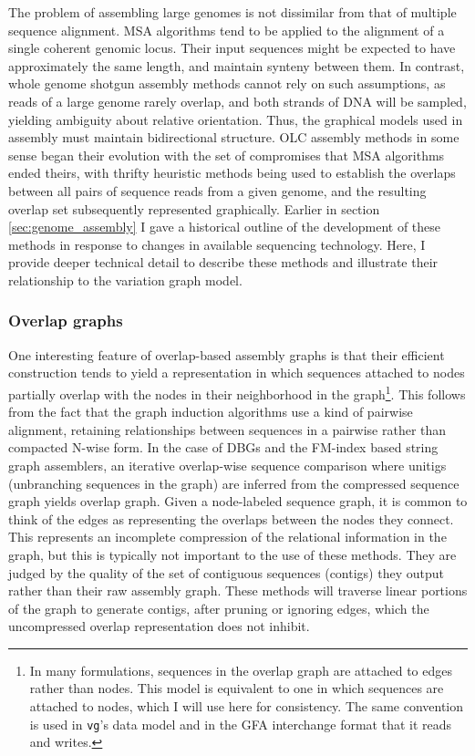The problem of assembling large genomes is not dissimilar from that of multiple sequence alignment.
MSA algorithms tend to be applied to the alignment of a single coherent genomic locus.
Their input sequences might be expected to have approximately the same length, and maintain synteny between them.
In contrast, whole genome shotgun assembly methods cannot rely on such assumptions, as reads of a large genome rarely overlap, and both strands of DNA will be sampled, yielding ambiguity about relative orientation.
Thus, the graphical models used in assembly must maintain bidirectional structure.
OLC assembly methods in some sense began their evolution with the set of compromises that MSA algorithms ended theirs, with thrifty heuristic methods being used to establish the overlaps between all pairs of sequence reads from a given genome, and the resulting overlap set subsequently represented graphically.
Earlier in section \ref{sec:genome_assembly} I gave a historical outline of the development of these methods in response to changes in available sequencing technology.
Here, I provide deeper technical detail to describe these methods and illustrate their relationship to the variation graph model.

\subsubsection{Overlap graphs}
\label{sec:overlap_graphs}

One interesting feature of overlap-based assembly graphs is that their efficient construction tends to yield a representation in which sequences attached to nodes partially overlap with the nodes in their neighborhood in the graph\footnote{In many formulations, sequences in the overlap graph are attached to edges rather than nodes. This model is equivalent to one in which sequences are attached to nodes, which I will use here for consistency. The same convention is used in {\tt vg}'s data model and in the GFA interchange format that it reads and writes.}.
This follows from the fact that the graph induction algorithms use a kind of pairwise alignment, retaining relationships between sequences in a pairwise rather than compacted N-wise form.
In the case of DBGs and the FM-index based string graph assemblers, an iterative overlap-wise sequence comparison where unitigs (unbranching sequences in the graph) are inferred from the compressed sequence graph yields overlap graph.
Given a node-labeled sequence graph, it is common to think of the edges as representing the overlaps between the nodes they connect.
This represents an incomplete compression of the relational information in the graph, but this is typically not important to the use of these methods.
They are judged by the quality of the set of contiguous sequences (contigs) they output rather than their raw assembly graph.
These methods will traverse linear portions of the graph to generate contigs, after pruning or ignoring edges, which the uncompressed overlap representation does not inhibit.

